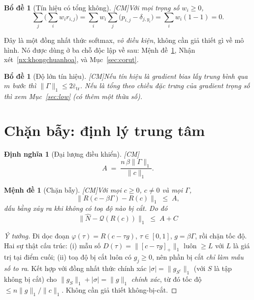 \documentclass[11pt,a4paper]{article}
\newtheorem{bode}[dinhly]{Bổ đề}
\newtheorem{menhde}[dinhly]{Mệnh đề}
\newtheorem{dinhnghia}[dinhly]{Định nghĩa}
\theoremstyle{remark}
\newcommand{\pos}[1]{\left[#1\right]_+}
\newcommand{\quant}{\mathcal{Q}}
\newcommand{\epstr}{\bar\varepsilon_{\mathrm{tr}}}
\newcommand{\CM}{\textsf{[CM]}}
\begin{document}
\begin{bode}[Tín hiệu có tổng không] \CM\label{bd:tongkhong}
Với mọi trọng số $w_i\ge0$,
\[
  \sum_j\Big(\sum_i w_i r_{i,j}\Big)
  =\sum_i w_i\sum_j \big(p_{i,j}-\delta_{j,y_i}\big)
  =\sum_i w_i (1-1)=0.
\]
\end{bode}

Đây là một đồng nhất thức softmax, \emph{vô điều kiện}, không cần giả thiết gì
về mô hình. Nó được dùng ở ba chỗ độc lập về sau: Mệnh đề~\ref{md:bay},
Nhận xét~\ref{nx:khongchuanhoa}, và Mục~\ref{sec:corut}.

\begin{bode}[Độ lớn tín hiệu] \CM\label{bd:dolon}
Nếu tín hiệu là gradient bias lấy trung bình qua $m$ bước thì
$\|\Gamma\|_1\le 2\epstr$. Nếu là tổng theo chiều đặc trưng của gradient trọng
số thì xem Mục~\ref{sec:low} (có thêm một thừa số).
\end{bode}

\section{Chặn bẫy: định lý trung tâm}

\begin{dinhnghia}[Đại lượng điều khiển] \CM\label{dn:A}
\[
  A \;=\; \frac{n\,\beta\|\Gamma\|_1}{\|c\|_1}.
\]
\end{dinhnghia}

\begin{menhde}[Chặn bẫy] \CM\label{md:bay}
Với mọi $c\ge0$, $c\ne0$ và mọi $\Gamma$,
\[
  \big\|R(c-\beta\Gamma)-R(c)\big\|_1 \;\le\; A ,
\]
dấu bằng xảy ra khi không có toạ độ nào bị cắt. Do đó
\[
  \boxed{\;\big\|\hat N-\quant(R(c))\big\|_1 \;\le\; A+C\;}
\]
\end{menhde}

\begin{proof}[Ý tưởng]
Đi dọc đoạn $\varphi(\tau)=R(c-\tau g)$, $\tau\in[0,1]$, $g=\beta\Gamma$, rồi
chặn tốc độ. Hai sự thật cấu trúc: (i) mẫu số $D(\tau)=\|\pos{c-\tau g}\|_1$
luôn $\ge L$ với $L$ là giá trị tại điểm cuối; (ii) toạ độ bị cắt luôn có
$g_j\ge0$, nên phần bị cắt \emph{chỉ làm mẫu số to ra}. Kết hợp với đồng nhất
thức chính xác $|\sigma|=\|g_{S^c}\|_1$ (với $S$ là tập không bị cắt) cho
$\|g_S\|_1+|\sigma|=\|g\|_1$ \emph{chính xác}, từ đó tốc độ $\le n\|g\|_1/\|c\|_1$.
Không cần giả thiết không-bị-cắt.
\end{proof}
\end{document}
